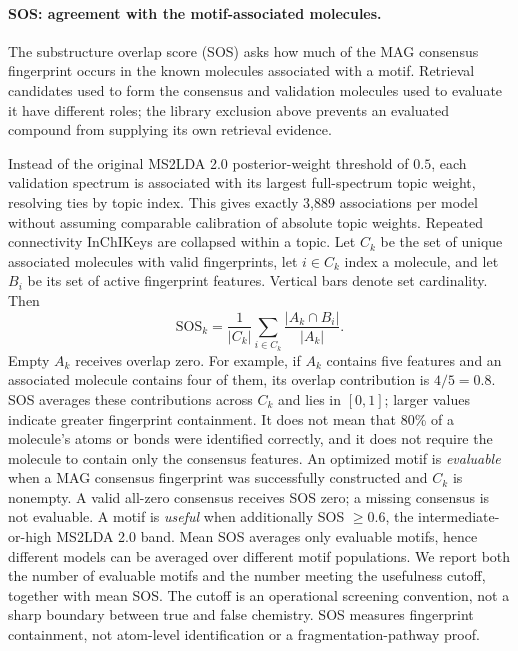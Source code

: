 \documentclass[10pt,a4paper]{article}
\begin{document}
\paragraph{SOS: agreement with the motif-associated molecules.}
The substructure overlap score (SOS) asks how much of the MAG consensus
fingerprint occurs in the known molecules associated with a motif. Retrieval
candidates used to form the consensus and validation molecules used to
evaluate it have different roles; the library exclusion above prevents an
evaluated compound from supplying its own retrieval evidence.

Instead of the original MS2LDA 2.0 posterior-weight threshold of $0.5$,
each validation spectrum is associated with its largest full-spectrum topic
weight, resolving ties by topic index. This gives exactly 3,889 associations
per model without assuming comparable calibration of absolute topic weights.
Repeated connectivity InChIKeys are collapsed within a topic.
Let $C_k$ be the set of unique associated molecules with valid fingerprints,
let $i\in C_k$ index a molecule, and let $B_i$ be its set of active fingerprint
features. Vertical bars denote set cardinality. Then
\begin{equation}
 \mathrm{SOS}_k=\frac1{|C_k|}\sum_{i\in C_k}
                   \frac{|A_k\cap B_i|}{|A_k|}.
 \label{eq:sos}
\end{equation}
Empty $A_k$ receives overlap zero.
For example, if $A_k$ contains five features and an associated molecule
contains four of them, its overlap contribution is $4/5=0.8$. SOS averages
these contributions across $C_k$ and lies in $[0,1]$; larger values indicate
greater fingerprint containment. It does not mean that 80\% of a molecule's
atoms or bonds were identified correctly, and it does not require the
molecule to contain only the consensus features.
An optimized motif is \emph{evaluable} when a MAG consensus fingerprint was
successfully constructed and $C_k$ is nonempty. A valid all-zero consensus
receives SOS zero; a missing consensus is not evaluable. A motif is
\emph{useful} when additionally SOS $\geq0.6$, the intermediate-or-high
MS2LDA 2.0 band. Mean SOS averages only evaluable motifs, hence different
models can be averaged over different motif populations.
We report both the number of evaluable motifs and the number meeting the
usefulness cutoff, together with mean SOS. The cutoff is an operational
screening convention, not a sharp boundary between true and false chemistry.
SOS measures fingerprint containment, not atom-level identification or a
fragmentation-pathway proof.
\end{document}
